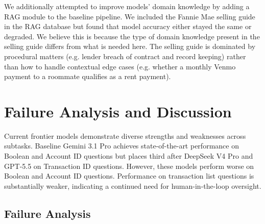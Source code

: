 \documentclass[11pt]{article}
\begin{document}
We additionally attempted to improve models' domain knowledge by adding a RAG module to the baseline pipeline.
We included the Fannie Mae selling guide in the RAG database but found that model accuracy either stayed the same or degraded.
We believe this is because the type of domain knowledge present in the selling guide differs from what is needed here.
The selling guide is dominated by procedural matters (e.g. lender breach of contract and record keeping) rather than how to handle contextual edge cases (e.g. whether a monthly Venmo payment to a roommate qualifies as a rent payment).










\section{Failure Analysis and Discussion}

Current frontier models demonstrate diverse strengths and weaknesses across subtasks. 
Baseline Gemini 3.1 Pro achieves state-of-the-art performance on Boolean and Account ID questions but places third after DeepSeek V4 Pro and GPT-5.5 on Transaction ID questions.
However, these models perform worse on Boolean and Account ID questions.
Performance on transaction list questions is substantially weaker, indicating a continued need for human-in-the-loop oversight.



\subsection{Failure Analysis}
\end{document}
